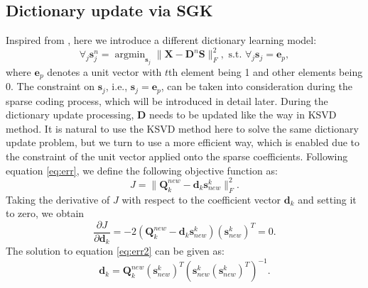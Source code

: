 \subsection{Dictionary update via SGK}
Inspired from \cite{sgk2013}, here we introduce a different dictionary learning model:
\begin{equation}
\label{eq:modelsgk}
\forall_{j}\mathbf{s}_j^{n}=\mathop{\text{argmin}}_{\mathbf{s}_j} \parallel \mathbf{X}-\mathbf{D}^{n}\mathbf{S} \parallel_{F}^{2},\,\,\text{s.t.}\,\, \forall_{j} \mathbf{s}_j = \mathbf{e}_p,
\end{equation}
where $\mathbf{e}_p$ denotes a unit vector with $t$th element being 1 and other elements being 0. The constraint on $\mathbf{s}_j$, i.e., $\mathbf{s}_j = \mathbf{e}_p$, can be taken into consideration during the sparse coding process, which will be introduced in detail later. During the dictionary update processing, $\mathbf{D}$ needs to be updated like the way in KSVD method. It is natural to use the KSVD method here to solve the same dictionary update problem, but we turn to use a more efficient way, which is enabled due to the constraint of the unit vector applied onto the sparse coefficients.  Following equation \ref{eq:err}, we define the following objective function as:
\begin{equation}
\label{eq:obj}
J=\parallel \mathbf{Q}_{k}^{new}-\mathbf{d}_{k}\mathbf{s}_{new}^{k} \parallel_{F}^{2}.
\end{equation}
Taking the derivative of $J$ with respect to the coefficient vector $\mathbf{d}_k$ and setting it to zero, we obtain
\begin{equation}
\label{eq:err2}
\frac{\partial J}{\partial  \mathbf{d}_k}=-2( \mathbf{Q}_{k}^{new}-\mathbf{d}_{k}\mathbf{s}_{new}^{k} )(\mathbf{s}_{new}^{k})^T=0.
\end{equation}
The solution to equation \ref{eq:err2} can be given as:
\begin{equation}
\label{eq:err3}
\mathbf{d}_{k}=\mathbf{Q}_{k}^{new}(\mathbf{s}_{new}^{k})^T(\mathbf{s}_{new}^{k}(\mathbf{s}_{new}^{k})^T)^{-1}.
\end{equation}

